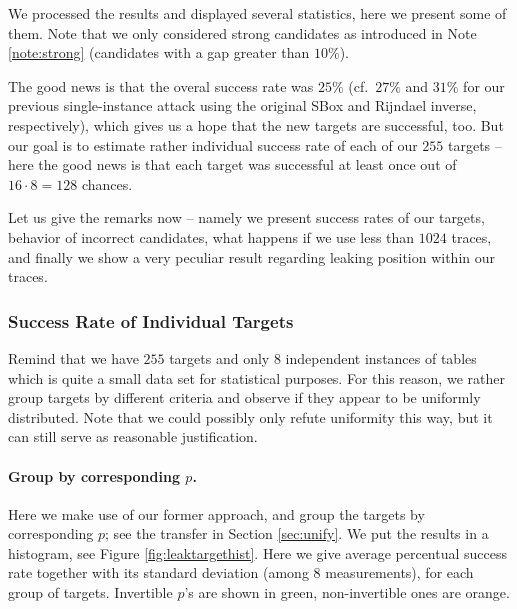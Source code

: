 We processed the results and displayed several statistics, here we present some of them. Note that we only considered strong candidates as introduced in Note \ref{note:strong} (candidates with a gap greater than $10\%$).

The good news is that the overal success rate was $25\%$ (cf.\ $27\%$ and $31\%$ for our previous single-instance attack using the original SBox and Rijndael inverse, respectively), which gives us a hope that the new targets are successful, too. But our goal is to estimate rather individual success rate of each of our $255$ targets -- here the good news is that each target was successful at least once out of $16\cdot8=128$ chances.

Let us give the remarks now -- namely we present success rates of our targets, behavior of incorrect candidates, what happens if we use less than $1024$ traces, and finally we show a very peculiar result regarding leaking position within our traces.

\subsubsection{Success Rate of Individual Targets}
	
	Remind that we have $255$ targets and only $8$ independent instances of tables which is quite a small data set for statistical purposes. For this reason, we rather group targets by different criteria and observe if they appear to be uniformly distributed. Note that we could possibly only refute uniformity this way, but it can still serve as reasonable justification.
	
	\paragraph{Group by corresponding $p$.}
	
	
	Here we make use of our former approach, and group the targets by corresponding $p$; see the transfer in Section \ref{sec:unify}. We put the results in a histogram, see Figure \ref{fig:leaktargethist}. Here we give average percentual success rate together with its standard deviation (among $8$ measurements), for each group of targets. Invertible $p$'s are shown in green, non-invertible ones are orange.
	
